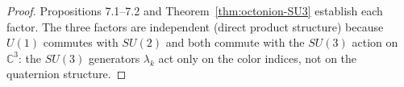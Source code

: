 \begin{proof}
Propositions 7.1--7.2 and Theorem~\ref{thm:octonion-SU3} establish each
factor.
The three factors are independent (direct product structure) because
$U(1)$ commutes with $SU(2)$ and both commute with the $SU(3)$ action
on $\mathbb{C}^3$: the $SU(3)$ generators $\lambda_k$ act only on the
color indices, not on the quaternion structure.
\end{proof}


